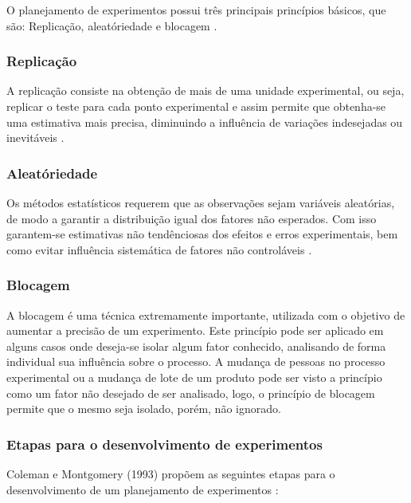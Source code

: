O planejamento de experimentos possui três principais princípios básicos, que são: Replicação, aleatóriedade e blocagem \cite{2}. 

\subsubsection*{Replicação}

A replicação consiste na obtenção de mais de uma unidade experimental, ou seja, replicar o teste para cada ponto experimental e assim permite que obtenha-se uma estimativa mais precisa, diminuindo a influência de variações indesejadas ou inevitáveis \cite{2}.

\subsubsection*{Aleatóriedade}

Os métodos estatísticos requerem que as observações sejam variáveis aleatórias, de modo a garantir a distribuição igual dos fatores não esperados. Com isso garantem-se estimativas não tendênciosas dos efeitos e erros experimentais, bem como evitar influência sistemática de fatores não controláveis \cite{2}. 
\subsubsection*{Blocagem}

A blocagem é uma técnica extremamente importante, utilizada com o objetivo de aumentar a precisão de um experimento. Este princípio pode ser aplicado em alguns casos onde deseja-se isolar algum fator conhecido, analisando de forma individual sua influência sobre o processo. A mudança de pessoas no processo experimental ou a mudança de lote de um produto pode ser visto a princípio como um fator não desejado de ser analisado, logo, o princípio de blocagem permite que o mesmo seja isolado, porém, não ignorado\cite{2}. 

\subsubsection{Etapas para o desenvolvimento de experimentos}
\label{subsec:etapas}

Coleman e Montgomery (1993) propõem as seguintes etapas para o desenvolvimento de um planejamento de experimentos \cite{3}:

